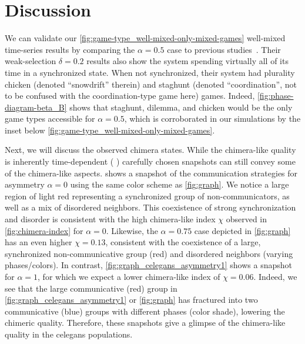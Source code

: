\documentclass[pdflatex,twocolumn,sn-nature,super]{sn-jnl}
\begin{document}
\section{Discussion}\label{sec:discussion}

We can validate our \cref{fig:game-type_well-mixed-only-mixed-games} well-mixed
time-series results by comparing the $\alpha = 0.5$ case
to previous studies~\citep{tripp2022evolutionary}.
Their weak-selection $\delta = 0.2$
results also show the system spending
virtually all of its time in a synchronized state.
When not synchronized, their system had plurality
chicken (denoted ``snowdrift'' therein)
and staghunt (denoted ``coordination'',
not to be confused with the coordination-type game here) games.
Indeed, \cref{fig:phase-diagram-beta_B}
shows that staghunt, dilemma, and chicken
would be the only game types accessible for $\alpha = 0.5$,
which is corroborated in our simulations by the inset below
\cref{fig:game-type_well-mixed-only-mixed-games}.

Next, we will discuss the observed chimera states.
While the chimera-like quality is inherently time-dependent
(\cf{} )
carefully chosen snapshots can still convey some of the chimera-like aspects.
 shows a snapshot of the communication strategies
for asymmetry $\alpha = 0$ using the same color scheme as \cref{fig:graph}.
We notice a large region of light red representing
a synchronized group of non-communicators,
as well as a mix of disordered neighbors.
This coexistence of strong synchronization and disorder
is consistent with the high
chimera-like index $\chi$ observed in \cref{fig:chimera-index} for $\alpha = 0$.
Likewise, the $\alpha = 0.75$ case depicted in \cref{fig:graph}
has an even higher $\chi = \num{0.13}$,
consistent with the coexistence of a large,
synchronized non-communicative group (red)
and disordered neighbors (varying phases/colors).
In contrast,
\cref{fig:graph_celegans_asymmetry1} shows a snapshot for $\alpha = 1$,
for which we expect a lower chimera-like index of $\chi = \num{0.06}$.
Indeed, we see that the large communicative (red) group
in \cref{fig:graph_celegans_asymmetry1}
or \cref{fig:graph} has fractured into two
communicative (blue) groups with different phases (color shade),
lowering the chimeric quality.
Therefore, these snapshots give a glimpse of the chimera-like quality
in the \gls{celegans} populations.
\end{document}
